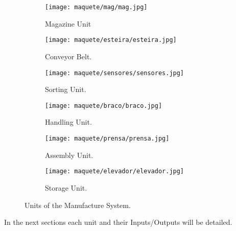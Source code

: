 \begin{figure}[H]
\begin{subfigure}[t]{0.325\textwidth}
  \centering
  \texttt{[image: maquete/mag/mag.jpg]}
  \caption{Magazine Unit}
\end{subfigure}
\hfill
\begin{subfigure}[t]{0.325\textwidth}
  \centering
  \texttt{[image: maquete/esteira/esteira.jpg]}
  \caption{Conveyor Belt.}
\end{subfigure}

\begin{subfigure}[t]{0.325\textwidth}
  \centering
  \texttt{[image: maquete/sensores/sensores.jpg]}
  \caption{Sorting Unit.}
\end{subfigure}
\hfill
\begin{subfigure}[t]{0.325\textwidth}
  \centering
  \texttt{[image: maquete/braco/braco.jpg]}
  \caption{Handling Unit.}
\end{subfigure}

\begin{subfigure}[t]{0.325\textwidth}
  \centering
  \texttt{[image: maquete/prensa/prensa.jpg]}
  \caption{Assembly Unit.}
\end{subfigure}
\hfill
\begin{subfigure}[t]{0.325\textwidth}
  \centering
  \texttt{[image: maquete/elevador/elevador.jpg]}
  \caption{Storage Unit.}
\end{subfigure}
  \caption{Units of the Manufacture System.}
  \label{fig:units}
\end{figure}

In the next sections each unit and their Inputs\slash Outputs will be detailed.


